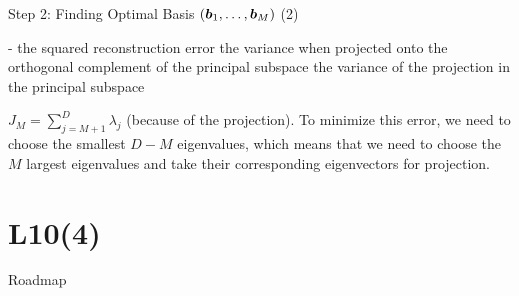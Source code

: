 \documentclass[handout,fleqn,aspectratio=169]{beamer}
\begin{document}
\begin{frame}{Step 2: Finding Optimal Basis $(\bm{b}_1, \ldots, \bm{b}_M)$ (2)}

\plitemsep 0.1in

\bci

\item[] 
-  the squared reconstruction error \redf{=}  the variance when projected onto the orthogonal complement of the principal subspace \redf{=}  the variance of the projection in the principal subspace

\item $J_M = \sum_{j=M+1}^D \lambda_j$ (because of the projection). To minimize this error, we need to choose the smallest $D-M$ eigenvalues, which means that we need to choose the $M$ largest eigenvalues and take their corresponding eigenvectors for projection.   

\eci
\end{frame}


\section{L10(4)}
\begin{frame}{Roadmap}

\plitemsep 0.1in

\bce[(1)] 

\item {} 
\item {} 
\item {}

\ece
\end{frame}
\end{document}
